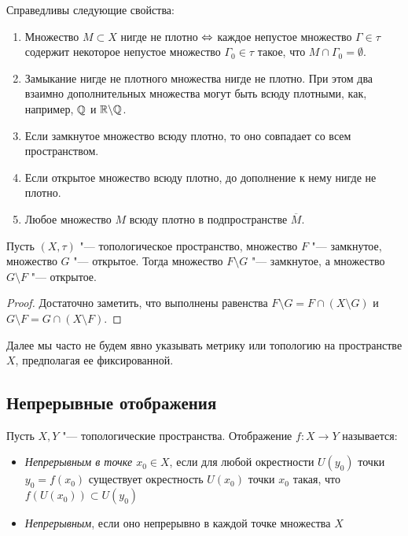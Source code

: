 \begin{note}
	Справедливы следующие свойства:
	\begin{enumerate}
		\item Множество ${M \subset X}$ нигде не плотно $\Leftrightarrow$ каждое непустое множество $\Gamma \in \tau$ содержит некоторое непустое множество $\Gamma_0 \in \tau$ такое, что $M \cap \Gamma_0 = \emptyset$.
		
		\item Замыкание нигде не плотного множества нигде не плотно. При этом два взаимно дополнительных множества могут быть всюду плотными, как, например, $\mathbb{Q}$ и $\mathbb{R}\backslash \mathbb{Q}$.
		
		\item Если замкнутое множество всюду плотно, то оно совпадает со всем пространством.
		
		\item Если открытое множество всюду плотно, до дополнение к нему нигде не плотно.
		
		\item Любое множество $M$ всюду плотно в подпространстве $\overline{M}$.
	\end{enumerate}
\end{note}

\begin{proposition}
	Пусть $(X, \tau)$ "--- топологическое пространство, множество $F$ "--- замкнутое, множество $G$ "--- открытое. Тогда множество $F \setminus G$ "--- замкнутое, а множество $G \setminus F$ "--- открытое.
\end{proposition}

\begin{proof}
	Достаточно заметить, что выполнены равенства $F\setminus G = F\cap (X\setminus G)$ и $G\setminus F = G\cap(X\setminus F)$.
\end{proof}

\begin{note}
	Далее мы часто не будем явно указывать метрику или топологию на пространстве $X$, предполагая ее фиксированной.
\end{note}

\subsection{Непрерывные отображения}

\begin{definition}
	Пусть $X, Y$ "--- топологические пространства. Отображение $f : X \to Y$ называется:
	\begin{itemize}
		\item \textit{Непрерывным в точке $x_0 \in X$}, если для любой окрестности $U(y_0)$ точки $y_0 = f(x_0)$ существует окрестность $U(x_0)$ точки $x_0$ такая, что $f(U(x_0)) \subset U(y_0)$
		
		\item \textit{Непрерывным}, если оно непрерывно в каждой точке множества $X$
	\end{itemize} 
\end{definition}

